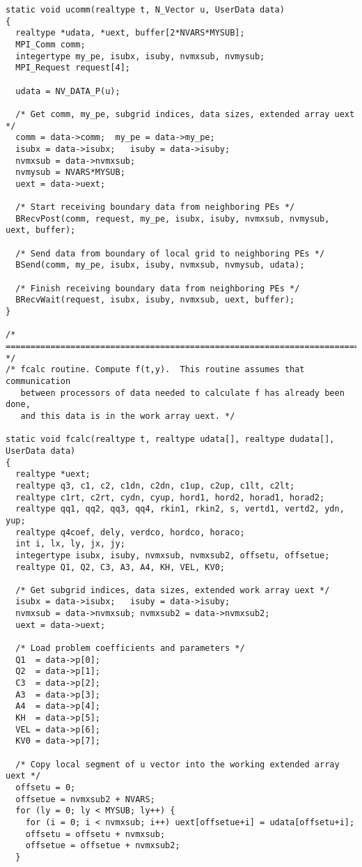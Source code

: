 \begin{verbatim}
static void ucomm(realtype t, N_Vector u, UserData data)
{
  realtype *udata, *uext, buffer[2*NVARS*MYSUB];
  MPI_Comm comm;
  integertype my_pe, isubx, isuby, nvmxsub, nvmysub;
  MPI_Request request[4];

  udata = NV_DATA_P(u);

  /* Get comm, my_pe, subgrid indices, data sizes, extended array uext */
  comm = data->comm;  my_pe = data->my_pe;
  isubx = data->isubx;   isuby = data->isuby;
  nvmxsub = data->nvmxsub;
  nvmysub = NVARS*MYSUB;
  uext = data->uext;

  /* Start receiving boundary data from neighboring PEs */
  BRecvPost(comm, request, my_pe, isubx, isuby, nvmxsub, nvmysub, uext, buffer);

  /* Send data from boundary of local grid to neighboring PEs */
  BSend(comm, my_pe, isubx, isuby, nvmxsub, nvmysub, udata);

  /* Finish receiving boundary data from neighboring PEs */
  BRecvWait(request, isubx, isuby, nvmxsub, uext, buffer);
}

/* ======================================================================= */
/* fcalc routine. Compute f(t,y).  This routine assumes that communication 
   between processors of data needed to calculate f has already been done,
   and this data is in the work array uext. */

static void fcalc(realtype t, realtype udata[], realtype dudata[], UserData data)
{
  realtype *uext;
  realtype q3, c1, c2, c1dn, c2dn, c1up, c2up, c1lt, c2lt;
  realtype c1rt, c2rt, cydn, cyup, hord1, hord2, horad1, horad2;
  realtype qq1, qq2, qq3, qq4, rkin1, rkin2, s, vertd1, vertd2, ydn, yup;
  realtype q4coef, dely, verdco, hordco, horaco;
  int i, lx, ly, jx, jy;
  integertype isubx, isuby, nvmxsub, nvmxsub2, offsetu, offsetue;
  realtype Q1, Q2, C3, A3, A4, KH, VEL, KV0;

  /* Get subgrid indices, data sizes, extended work array uext */
  isubx = data->isubx;   isuby = data->isuby;
  nvmxsub = data->nvmxsub; nvmxsub2 = data->nvmxsub2;
  uext = data->uext;

  /* Load problem coefficients and parameters */
  Q1  = data->p[0];
  Q2  = data->p[1];
  C3  = data->p[2];
  A3  = data->p[3];
  A4  = data->p[4];
  KH  = data->p[5];
  VEL = data->p[6];
  KV0 = data->p[7];

  /* Copy local segment of u vector into the working extended array uext */
  offsetu = 0;
  offsetue = nvmxsub2 + NVARS;
  for (ly = 0; ly < MYSUB; ly++) {
    for (i = 0; i < nvmxsub; i++) uext[offsetue+i] = udata[offsetu+i];
    offsetu = offsetu + nvmxsub;
    offsetue = offsetue + nvmxsub2;
  }


\end{verbatim}
